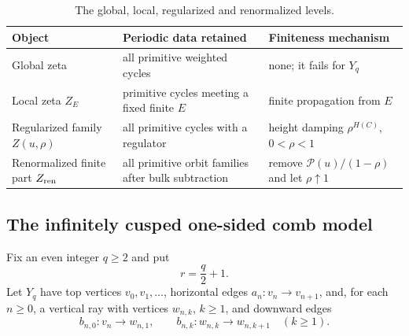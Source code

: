 \documentclass[11pt,reqno]{amsart}
\numberwithin{equation}{section}
\theoremstyle{definition}
\theoremstyle{remark}
\begin{document}
\begin{table}[H]
\centering
\caption{The global, local, regularized and renormalized levels.}
\label{tab:zeta-hierarchy}
\begin{tabular}{>{\raggedright\arraybackslash}p{}
                >{\raggedright\arraybackslash}p{}
                >{\raggedright\arraybackslash}p{}}
\toprule
Object & Periodic data retained & Finiteness mechanism\\
\midrule
Global zeta & all primitive weighted cycles & none; it fails for $Y_q$\\
Local zeta $Z_E$ & primitive cycles meeting a fixed finite $E$ & finite
propagation from $E$\\
Regularized family $Z(u,\rho)$ & all primitive cycles with a regulator &
height damping $\rho^{H(C)}$, $0<\rho<1$\\
Renormalized finite part $Z_{\rm ren}$ & all primitive orbit families after
bulk subtraction & remove $\mathscr P(u)/(1-\rho)$ and let $\rho\uparrow1$\\
\bottomrule
\end{tabular}
\end{table}

\subsection{The infinitely cusped one-sided comb model}
\label{sec:comb}

Fix an even integer $q\ge2$ and put
\[
 r=\frac q2+1.
\]
Let $Y_q$ have top vertices $v_0,v_1,\ldots$, horizontal edges
$a_n:v_n\to v_{n+1}$, and, for each $n\ge0$, a vertical ray with vertices
$w_{n,k}$, $k\ge1$, and downward edges
\[
 b_{n,0}:v_n\to w_{n,1},
 \qquad
 b_{n,k}:w_{n,k}\to w_{n,k+1}\quad(k\ge1).
\]
\end{document}
